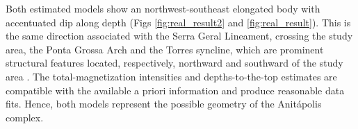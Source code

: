 Both estimated models show an northwest-southeast elongated body with accentuated dip along depth 
(Figs \ref{fig:real_result2} and \ref{fig:real_result}).
This is the same direction associated with the Serra Geral Lineament, 
crossing the study area, the Ponta Grossa Arch and the Torres syncline,
which are prominent structural features located, respectively, 
northward and southward of the study area \citep[e.g., ][ p. 535]{scheibe-etal2005}.
The total-magnetization intensities and depths-to-the-top estimates are compatible with 
the available a priori information and produce reasonable data fits.
Hence, both models represent the possible geometry of the Anit{\'a}polis complex. 